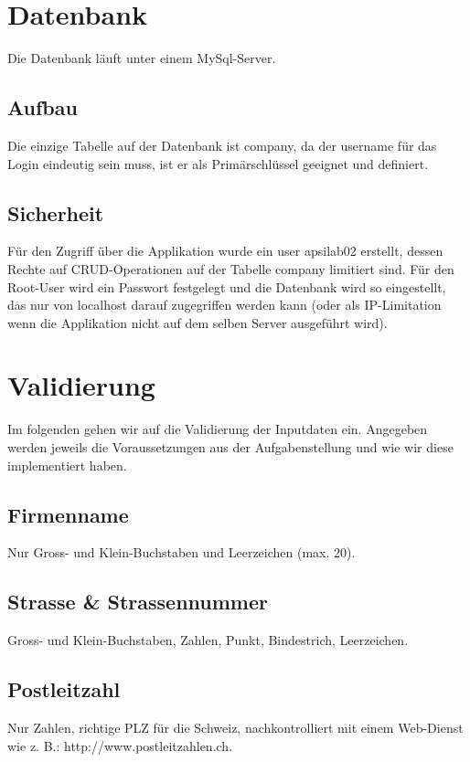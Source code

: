 \documentclass[12pt]{scrartcl}
\begin{document}
\section{Datenbank}
Die Datenbank läuft unter einem MySql-Server.
\subsection{Aufbau}
Die einzige Tabelle auf der Datenbank ist company, da der username für das Login eindeutig sein muss, ist er als Primärschlüssel geeignet und definiert.

\subsection{Sicherheit}
Für den Zugriff über die Applikation wurde ein user apsilab02 erstellt, dessen Rechte auf CRUD-Operationen auf der Tabelle company limitiert sind. Für den Root-User wird ein Passwort festgelegt und die Datenbank wird so eingestellt, das nur von localhost darauf zugegriffen werden kann (oder als IP-Limitation wenn die Applikation nicht auf dem selben Server ausgeführt wird).
\section{Validierung}
Im folgenden gehen wir auf die Validierung der Inputdaten ein. Angegeben werden jeweils die Voraussetzungen aus der Aufgabenstellung und wie wir diese implementiert haben.

\subsection{Firmenname}
Nur Gross- und Klein-Buchstaben und Leerzeichen (max. 20).


\subsection{Strasse \& Strassennummer}
Gross- und Klein-Buchstaben, Zahlen, Punkt, Bindestrich, Leerzeichen.


\subsection{Postleitzahl}
Nur Zahlen, richtige PLZ für die Schweiz, nachkontrolliert mit einem Web-Dienst wie z. B.: http://www.postleitzahlen.ch.

\end{document}
